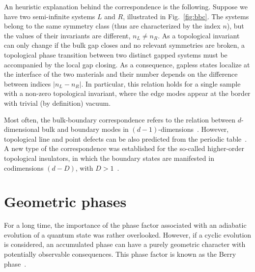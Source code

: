 An heuristic explanation behind the correspondence is the following. Suppose we have two semi-infinite systems $L$ and $R$, illustrated in Fig.~\ref{fig:bbc}. The systems belong to the same symmetry class (thus are characterized by the index $n$), but the values of their invariants are different, $n_L \neq n_R$. As a topological invariant can only change if the bulk gap closes and no relevant symmetries are broken, a topological phase transition between two distinct gapped systems must be accompanied by the local gap closing. As a consequence, gapless states localize at the interface of the two materials and their number depends on the difference between indices $|n_L  - n_R|$. In particular, this relation holds for a single sample with a non-zero topological invariant, where the edge modes appear at the border with trivial (by definition) vacuum.

Most often, the bulk-boundary correspondence refers to the relation between $d$-dimensional bulk and boundary modes in $(d-1)$-dimensions~\cite{prodan2016bulk}. However, topological line and point defects can be also predicted from the periodic table~\cite{PhysRevB.82.115120}. A new type of the correspondence was established for the so-called higher-order topological insulators, in which the boundary states are manifested in codimensions $(d-D)$, with $ D>1$~\cite{HOTI12018}.

\section{Geometric phases}
\label{sec:geometric_phase}
For a long time, the importance of the phase factor associated with an adiabatic evolution of a quantum state was rather overlooked. However, if a cyclic evolution is considered, an accumulated phase can have a purely geometric character with potentially observable consequences. This phase factor is known as the Berry phase~\cite{berry84}. 
